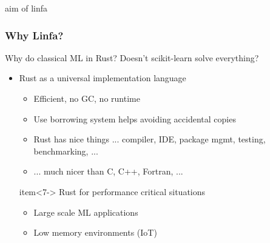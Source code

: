 \documentclass[xcolor=x11names,compress]{beamer}
\begin{document}
\begin{frame}{aim of linfa}
    \frametitle{Why Linfa?}
    Why do classical ML in Rust? Doesn't scikit-learn solve everything?
    \begin{itemize}
        \item<2-> Rust as a universal implementation language
        \begin{itemize}[label=-]
            \item<4->{Efficient, no GC, no runtime}
	    \item<5->{Use borrowing system helps avoiding accidental copies}
	    \item<5->{Rust has nice things ... compiler, IDE, package mgmt, testing, benchmarking, ...}
	    \item<6->{... much nicer than C, C++, Fortran, ...}
        \end{itemize}
	item<7-> Rust for performance critical situations
        \begin{itemize}[label=-]
            \item<8->{Large scale ML applications}
	    \item<9->{Low memory environments (IoT)}
        \end{itemize}	
    \end{itemize}
\end{frame}
\end{document}
